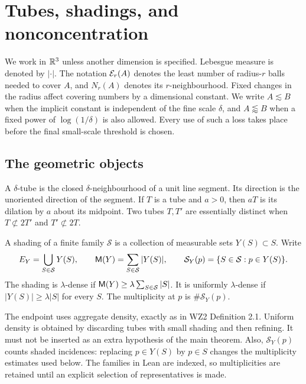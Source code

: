 \chapter{Tubes, shadings, and nonconcentration}
\label{chap:geometry}

We work in $\mathbb{R}^3$ unless another dimension is specified. Lebesgue measure
is denoted by $|\cdot|$. The notation $\mathcal{E}_r(A)$ denotes the least number
of radius-$r$ balls needed to cover $A$, and $N_r(A)$ denotes its
$r$-neighbourhood. Fixed changes in the radius affect covering numbers
by a dimensional constant. We write $A\lesssim B$ when the implicit
constant is independent of the fine scale $\delta$, and $A\lessapprox B$
when a fixed power of $\log(1/\delta)$ is also allowed. Every use of such
a loss takes place before the final small-scale threshold is chosen.

\section{The geometric objects}

\begin{definition}
\label{def:tube}
\leanok
A $\delta$-tube is the closed $\delta$-neighbourhood of a unit line
segment. Its direction is the unoriented direction of the segment. If
$T$ is a tube and $a>0$, then $aT$ is its dilation by $a$ about its
midpoint. Two tubes $T,T'$ are essentially distinct when
$T\not\subset 2T'$ and $T'\not\subset 2T$.
\end{definition}

\begin{definition}
\label{def:shading}
\leanok
{}
A shading of a finite family $\mathcal S$ is a collection of measurable
sets $Y(S)\subset S$. Write
\[
 E_Y=\bigcup_{S\in\mathcal S}Y(S),\qquad
 \mathsf{M}(Y)=\sum_{S\in\mathcal S}|Y(S)|,\qquad
 \mathcal S_Y(p)=\{S\in\mathcal S:p\in Y(S)\}.
\]
The shading is $\lambda$-dense if
$\mathsf{M}(Y)\geq\lambda\sum_{S\in\mathcal S}|S|$.
It is uniformly $\lambda$-dense if $|Y(S)|\geq\lambda|S|$ for every
$S$. The multiplicity at $p$ is $\#\mathcal S_Y(p)$.
\end{definition}

\begin{remark}
\label{rem:aggregate-density}
The endpoint uses aggregate density, exactly as in WZ2 Definition 2.1.
Uniform density is obtained by discarding tubes with small shading and
then refining. It must not be inserted as an extra hypothesis of the
main theorem. Also, $\mathcal S_Y(p)$ counts shaded incidences: replacing
$p\in Y(S)$ by $p\in S$ changes the multiplicity estimates used below.
The families in Lean are indexed, so multiplicities are retained until
an explicit selection of representatives is made.
\end{remark}

